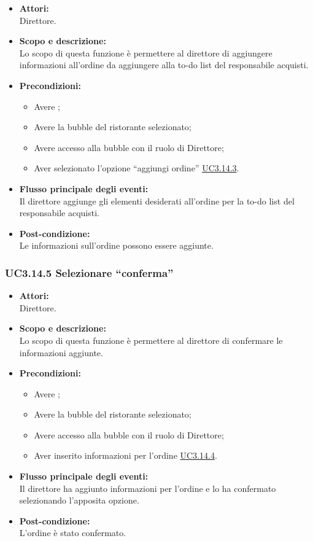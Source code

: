 \begin{itemize}
	\item \textbf{Attori:}
	\\Direttore.
	\item \textbf{Scopo e descrizione:} 
	\\Lo scopo di questa funzione è permettere al direttore di aggiungere informazioni all’ordine da aggiungere alla to-do list del responsabile acquisti.
	\item \textbf{Precondizioni:}
	\begin{itemize}
		\item Avere ;
		\item Avere la bubble del ristorante selezionato;
		\item Avere accesso alla bubble con il ruolo di Direttore;
		\item Aver selezionato l’opzione “aggiungi ordine” \hyperref[UC3.14.3]{UC3.14.3}.
	\end{itemize}
	\item \textbf{Flusso principale degli eventi:}
	\\Il direttore aggiunge gli elementi desiderati all’ordine per la to-do list del responsabile acquisti.
	\item \textbf{Post-condizione:}
	\\Le informazioni sull’ordine possono essere aggiunte.
\end{itemize}

\subsubsection{UC3.14.5 Selezionare “conferma”} \label{UC3.14.5}

\begin{itemize}
	\item \textbf{Attori:}
	\\Direttore.
	\item \textbf{Scopo e descrizione:} 
	\\Lo scopo di questa funzione è permettere al direttore di confermare le informazioni aggiunte.
	\item \textbf{Precondizioni:}
	\begin{itemize}
		\item Avere ;
		\item Avere la bubble del ristorante selezionato;
		\item Avere accesso alla bubble con il ruolo di Direttore;
		\item Aver inserito informazioni per l’ordine \hyperref[UC3.14.4]{UC3.14.4}.
	\end{itemize}
	\item \textbf{Flusso principale degli eventi:}
	\\Il direttore ha aggiunto informazioni per l’ordine e lo ha confermato selezionando l’apposita opzione.
	\item \textbf{Post-condizione:}
	\\L’ordine è stato confermato.
\end{itemize}

